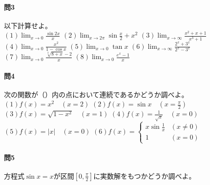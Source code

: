 \documentclass[a4j,dvipdfmx]{jsarticle}
\begin{document}
                \paragraph{問3}以下計算せよ。\\

                \noindent
                $(1)\displaystyle \lim_{x\to 0}\frac{\sin2x}{x}$\hspace{3mm}
                $(2)\displaystyle \lim_{x\to 2\pi}\sin \frac{x}{2}+x^2$\hspace{3mm}
                $(3)\displaystyle \lim_{x\to\infty}\frac{x^2+x+1}{x^3+1}$\hspace{3mm}
                $(4)\displaystyle \lim_{x\to 0}\frac{x^2}{1-\cos x}$\hspace{3mm}
                $(5)\displaystyle \lim_{x\to 0}\tan x$\hspace{3mm}
                $(6)\displaystyle \lim_{x\to\infty}\frac{2^x+3^x}{2^x-3^x}$\\
                $(7)\displaystyle \lim_{x\to 0}\frac{\sqrt[3]{8+x}-2}{x}$\hspace{3mm}
                $(8)\displaystyle \lim_{x\to 0}\frac{e^x-1}{x}$
                
                \paragraph{問4}次の関数が（）内の点において連続であるかどうか調べよ。\\
                $(1)f(x)=x^2\quad(x=2)$\hspace{1mm}
                $(2)f(x)=\sin x\quad(x=\frac{\pi}{2})$\hspace{1mm}
                $(3)f(x)=\sqrt{1-x^2}\quad(x=1)$\hspace{1mm}
                $(4)f(x)=\frac{1}{\sqrt{x}}\quad(x=0)$\\
                $(5)f(x)=|x|\quad(x=0)$\hspace{1mm}
                $(6)\displaystyle f(x)=\left\{\begin{array}{lr}\displaystyle x\sin\frac{1}{x}&(x\neq 0)\\1&(x=0)\end{array}\right.$\\

                \paragraph{問5}方程式$\sin x=x$が区間$[0,\frac{\pi}{2}]$に実数解をもつかどうか調べよ。
            \clearpage
\end{document}
